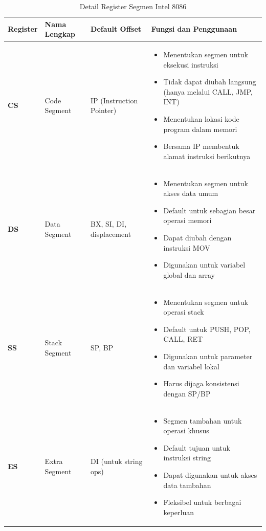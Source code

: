 \begin{table}[h]
\centering
\caption{Detail Register Segmen Intel 8086}
\begin{tabular}{|p{2cm}|p{3cm}|p{4cm}|p{6cm}|}
\hline
\textbf{Register} & \textbf{Nama Lengkap} & \textbf{Default Offset} & \textbf{Fungsi dan Penggunaan} \\
\hline
\textbf{CS} & Code Segment & IP (Instruction Pointer) & \begin{itemize}
\item Menentukan segmen untuk eksekusi instruksi
\item Tidak dapat diubah langsung (hanya melalui CALL, JMP, INT)
\item Menentukan lokasi kode program dalam memori
\item Bersama IP membentuk alamat instruksi berikutnya
\end{itemize} \\
\hline
\textbf{DS} & Data Segment & BX, SI, DI, displacement & \begin{itemize}
\item Menentukan segmen untuk akses data umum
\item Default untuk sebagian besar operasi memori
\item Dapat diubah dengan instruksi MOV
\item Digunakan untuk variabel global dan array
\end{itemize} \\
\hline
\textbf{SS} & Stack Segment & SP, BP & \begin{itemize}
\item Menentukan segmen untuk operasi stack
\item Default untuk PUSH, POP, CALL, RET
\item Digunakan untuk parameter dan variabel lokal
\item Harus dijaga konsistensi dengan SP/BP
\end{itemize} \\
\hline
\textbf{ES} & Extra Segment & DI (untuk string ops) & \begin{itemize}
\item Segmen tambahan untuk operasi khusus
\item Default tujuan untuk instruksi string
\item Dapat digunakan untuk akses data tambahan
\item Fleksibel untuk berbagai keperluan
\end{itemize} \\
\hline
\end{tabular}
\label{tab:segment-registers-detail}
\end{table}

